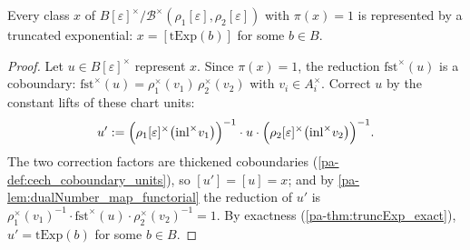 \begin{theorem}
  \label{pa-thm:cech_kernel_surjectivity}
  \leanok

  Every class \(x\) of
  \(B[\varepsilon]^\times / \mathcal B^\times(\rho_1[\varepsilon],
  \rho_2[\varepsilon])\) with \(\pi(x) = 1\) is represented by a truncated exponential:
  \(x = [\mathrm{tExp}(b)]\) for some \(b \in B\).
\end{theorem}
\begin{proof}
  \leanok
  Let \(u \in B[\varepsilon]^\times\) represent \(x\). Since \(\pi(x) = 1\), the
  reduction \(\mathrm{fst}^\times(u)\) is a coboundary:
  \(\mathrm{fst}^\times(u) = \rho_1^\times(v_1)\,\rho_2^\times(v_2)\) with
  \(v_i \in A_i^\times\). Correct \(u\) by the constant lifts of these chart units:
  \[
    u' := \Bigl(\rho_1[\varepsilon]^\times\bigl(\mathrm{inl}^\times v_1\bigr)\Bigr)^{-1}
      \cdot u \cdot
      \Bigl(\rho_2[\varepsilon]^\times\bigl(\mathrm{inl}^\times v_2\bigr)\Bigr)^{-1}.
  \]
  The two correction factors are thickened coboundaries
  (\ref{pa-def:cech_coboundary_units}), so \([u'] = [u] = x\); and by
  \ref{pa-lem:dualNumber_map_functorial} the reduction of \(u'\) is
  \(\rho_1^\times(v_1)^{-1} \cdot \mathrm{fst}^\times(u) \cdot \rho_2^\times(v_2)^{-1}
  = 1\). By exactness (\ref{pa-thm:truncExp_exact}), \(u' = \mathrm{tExp}(b)\) for some
  \(b \in B\).
\end{proof}

